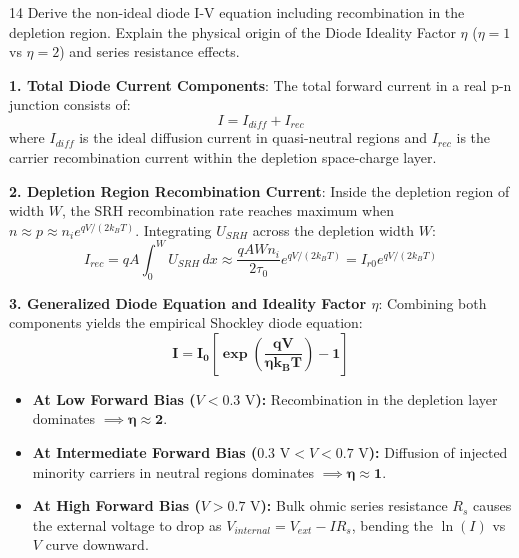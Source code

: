 \begin{theoryq}{14}
Derive the non-ideal diode I-V equation including recombination in the depletion region. Explain the physical origin of the Diode Ideality Factor $\eta$ ($\eta=1$ vs $\eta=2$) and series resistance effects.
\end{theoryq}
\begin{theorysol}
\textbf{1. Total Diode Current Components}:
The total forward current in a real p-n junction consists of:
\begin{equation}
I = I_{diff} + I_{rec}
\end{equation}
where $I_{diff}$ is the ideal diffusion current in quasi-neutral regions and $I_{rec}$ is the carrier recombination current within the depletion space-charge layer.

\textbf{2. Depletion Region Recombination Current}:
Inside the depletion region of width $W$, the SRH recombination rate reaches maximum when $n \approx p \approx n_i e^{qV / (2k_B T)}$.
Integrating $U_{SRH}$ across the depletion width $W$:
\begin{equation}
I_{rec} = q A \int_0^W U_{SRH}\, dx \approx \frac{q A W n_i}{2\tau_0} e^{q V / (2k_B T)} = I_{r0} e^{q V / (2k_B T)}
\end{equation}

\textbf{3. Generalized Diode Equation and Ideality Factor $\eta$}:
Combining both components yields the empirical Shockley diode equation:
\begin{equation}
\mathbf{I = I_0 \left[\exp\left(\frac{q V}{\eta k_B T}\right) - 1\right]}
\end{equation}
\begin{itemize}
\item \textbf{At Low Forward Bias ($V < 0.3\text{ V}$):} Recombination in the depletion layer dominates $\implies \mathbf{\eta \approx 2}$.
\item \textbf{At Intermediate Forward Bias ($0.3\text{ V} < V < 0.7\text{ V}$):} Diffusion of injected minority carriers in neutral regions dominates $\implies \mathbf{\eta \approx 1}$.
\item \textbf{At High Forward Bias ($V > 0.7\text{ V}$):} Bulk ohmic series resistance $R_s$ causes the external voltage to drop as $V_{internal} = V_{ext} - I R_s$, bending the $\ln(I)$ vs $V$ curve downward.
\end{itemize}

\end{theorysol}
\vspace{4mm}

